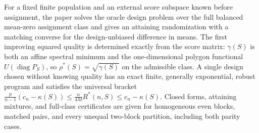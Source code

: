 For a fixed finite population and an external score subspace known before assignment, the paper solves the oracle design problem over the full balanced mean-zero assignment class and gives an attaining randomization with a matching converse for the design-unbiased difference in means.  The first improving squared quality is determined exactly from the score matrix: \(\gamma(S)\) is both an affine spectral minimum and the one-dimensional polygon functional \(U(\operatorname{diag}P_S)\), so \(\rho^*(S)=\sqrt{\gamma(S)}\) on the admissible class.  A single design chosen without knowing quality has an exact finite, generally exponential, robust program and satisfies the universal bracket \(\frac{p}{n-1}(c_n-\kappa(S))\leq\frac{n}{4M}R^*(n,S)\leq c_n-\kappa(S)\).  Closed forms, attaining mixtures, and full-class certificates are given for homogeneous even blocks, matched pairs, and every unequal two-block partition, including both parity cases.